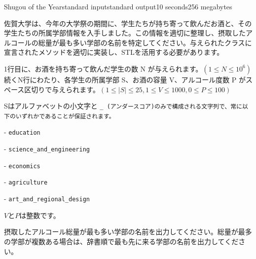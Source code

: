 \begin{problem}{Shugou of the Year}{standard input}{standard output}{10 seconds}{256 megabytes}

佐賀大学は、今年の大学祭の期間に、学生たちが持ち寄って飲んだお酒と、その学生たちの所属学部情報を入手しました。この情報を適切に整理し、摂取したアルコールの総量が最も多い学部の名前を特定してください。与えられたクラスに宣言されたメソッドを適切に実装し、STLを活用する必要があります。


\InputFile
1行目に、お酒を持ち寄って飲んだ学生の数 N が与えられます。$(1 \le N \le 10^6)$
続くN行にわたり、各学生の所属学部 S、お酒の容量 V、アルコール度数 P がスペース区切りで与えられます。$(1 \le |S| \le 25, 1 \le V \le 1000, 0 \le P \le 100)$

Sはアルファベットの小文字と \tt{_} (アンダースコア)のみで構成される文字列で、常に以下のいずれかであることが保証されます。

- \tt{education}

- \tt{science_and_engineering}

- \tt{economics}

- \tt{agriculture}

- \tt{art_and_regional_design}

$V$と$P$は整数です。


\OutputFile
摂取したアルコール総量が最も多い学部の名前を出力してください。総量が最多の学部が複数ある場合は、辞書順で最も先に来る学部の名前を出力してください。



\end{problem}

